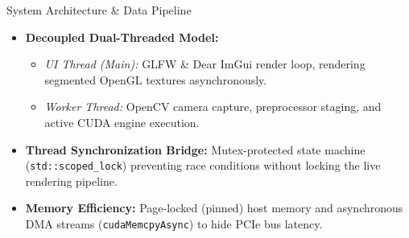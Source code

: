 \documentclass[11pt]{beamer}
\begin{document}
\begin{frame}{System Architecture \& Data Pipeline}
    \begin{itemize}
        \item \textbf{Decoupled Dual-Threaded Model:}
        \begin{itemize}
            \item \emph{UI Thread (Main):} GLFW \& Dear ImGui render loop, rendering segmented OpenGL textures asynchronously.
            \item \emph{Worker Thread:} OpenCV camera capture, preprocessor staging, and active CUDA engine execution.
        \end{itemize}
        \item \textbf{Thread Synchronization Bridge:} Mutex-protected state machine (\texttt{std::scoped\_lock}) preventing race conditions without locking the live rendering pipeline.
        \item \textbf{Memory Efficiency:} Page-locked (pinned) host memory and asynchronous DMA streams (\texttt{cudaMemcpyAsync}) to hide PCIe bus latency.
    \end{itemize}
\end{frame}
\end{document}
